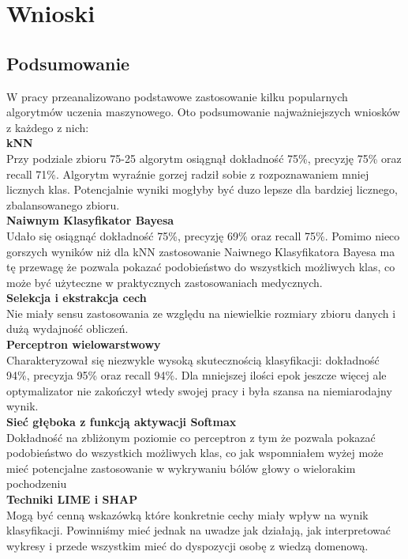 \section{Wnioski}
\subsection{Podsumowanie}
W pracy przeanalizowano podstawowe zastosowanie kilku popularnych algorytmów uczenia maszynowego. Oto podsumowanie najważniejszych wniosków z każdego z nich:\\

\textbf{kNN}\\
Przy podziale zbioru 75-25 algorytm osiągnął dokładność 75\%, precyzję 75\% oraz recall 71\%. Algorytm wyraźnie gorzej radził sobie z rozpoznawaniem mniej licznych klas. Potencjalnie wyniki mogłyby być duzo lepsze dla bardziej licznego, zbalansowanego zbioru.\\

\textbf{Naiwnym Klasyfikator Bayesa}\\
Udało się osiągnąć dokładność 75\%, precyzję 69\% oraz recall 75\%. Pomimo nieco gorszych wyników niż dla kNN zastosowanie Naiwnego Klasyfikatora Bayesa ma tę przewagę że pozwala pokazać podobieństwo do wszystkich możliwych klas, co może być użyteczne w praktycznych zastosowaniach medycznych.\\

\textbf{Selekcja i ekstrakcja cech}\\
Nie miały sensu zastosowania ze względu na niewielkie rozmiary zbioru danych i dużą wydajność obliczeń.\\

\textbf{Perceptron wielowarstwowy}\\
Charakteryzował się niezwykle wysoką skutecznością klasyfikacji: dokładność 94\%, precyzja 95\% oraz recall 94\%. Dla mniejszej ilości epok jeszcze więcej ale optymalizator nie zakończył wtedy swojej pracy i była szansa na niemiarodajny wynik.\\

\textbf{Sieć głęboka z funkcją aktywacji Softmax}\\
Dokładność na zbliżonym poziomie co perceptron z tym że pozwala pokazać podobieństwo do wszystkich możliwych klas, co jak wspomniałem wyżej może mieć potencjalne zastosowanie w wykrywaniu bólów głowy o wielorakim pochodzeniu\\

\textbf{Techniki LIME i SHAP}\\
Mogą być cenną wskazówką które konkretnie cechy miały wpływ na wynik klasyfikacji. Powinniśmy mieć jednak na uwadze jak działają, jak interpretować wykresy i przede wszystkim mieć do dyspozycji osobę z wiedzą domenową.

